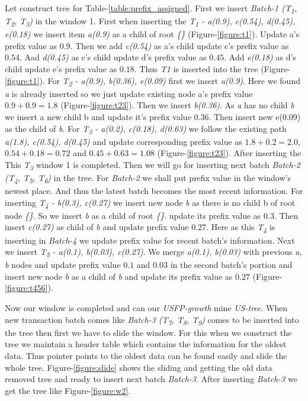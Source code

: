     Let construct tree for Table-\ref{table:prefix_assigned}. First we insert \emph{Batch-1 (T\textsubscript{1}, T\textsubscript{2}, T\textsubscript{3})} in the window 1. First when inserting the \emph{T\textsubscript{1} - a(0.9), c(0.54), d(0.45), e(0.18)} we insert item \emph{a(0.9)} as a child of root \emph{\{\}} (Figure-\ref{figure:t1}). Update a's prefix value as $0.9$. Then we add \emph{c(0.54)} as a's child update c's prefix value as $0.54$. Aad \emph{d(0.45)} as c's child update d's prefix value as $0.45$. Add \emph{e(0.18)} as d's child update e's prefix value as $0.18$. Thus \emph{T1} is inserted into the tree (Figure-\ref{figure:t1}). For \emph{T\textsubscript{2} - a(0.9), b(0.36), e(0.09)} first we insert \emph{a(0.9)}. Here we found \emph{a} is already inserted so we just update existing node a's prefix value $0.9 + 0.9 = 1.8$ (Figure-\ref{figure:t23}). Then we insert \emph{b(0.36)}. As \emph{a} has no child \emph{b} we insert a new child b and update it's prefix value $0.36$. Then insert new e(0.09) as the child of \emph{b}. For \emph{T\textsubscript{3} - a(0.2), c(0.18), d(0.63)} we follow the existing path \emph{a(1.8), c(0.54), d(0.45)} and update corresponding prefix value as $1.8 + 0.2 = 2.0$, $0.54 + 0.18 = 0.72$ and $0.45 + 0.63 = 1.08$ (Figure-\ref{figure:t23}). After inserting the This \emph{T\textsubscript{3}} window 1 is completed. Then we will go for inserting next batch \emph{Batch-2 (T\textsubscript{4}, T\textsubscript{5}, T\textsubscript{6})} in the tree. For \emph{Batch-2} we shall put prefix value in the window's newest place. And thus the latest batch becomes the most recent information. For inserting \emph{T\textsubscript{4} - b(0.3), c(0.27)} we insert new node \emph{b} as there is no child b of root node \emph{\{\}}. So we insert \emph{b} as a child of root \emph{\{\}}. update its prefix value as $0.3$. Then insert \emph{c(0.27)} as child of \emph{b} and update prefix value $0.27$. Here as this \emph{T\textsubscript{4}} is inserting in \emph{Batch-4} we update prefix value for recent batch's information. Next we insert \emph{T\textsubscript{5} - a(0.1), b(0.03), c(0.27)}. We merge \emph{a(0.1), b(0.03)} with previous \emph{a, b } nodes and update prefix value $0.1$ and $0.03$ in the second batch's portion and insert new node \emph{b} as a child of \emph{b} and update its prefix value as $0.27$ (Figure-\ref{figure:t456}).
    
    Now our window is completed and can our \emph{USFP-growth} mine \emph {US-tree}. When new transaction batch comes like \emph{Batch-3 (T\textsubscript{7}, T\textsubscript{8}, T\textsubscript{9})} comes to be inserted into the tree then first we have to slide the window. For this when we construct the tree we maintain a header table which contains the information for the oldest data. Thus pointer points to the oldest data can be found easily and slide the whole tree. Figure-\ref{figure:slide} shows the sliding and getting the old data removed tree and ready to insert next batch \emph{Batch-3}. After inserting \emph{Batch-3} we get the tree like Figure-\ref{figure:w2}. 
